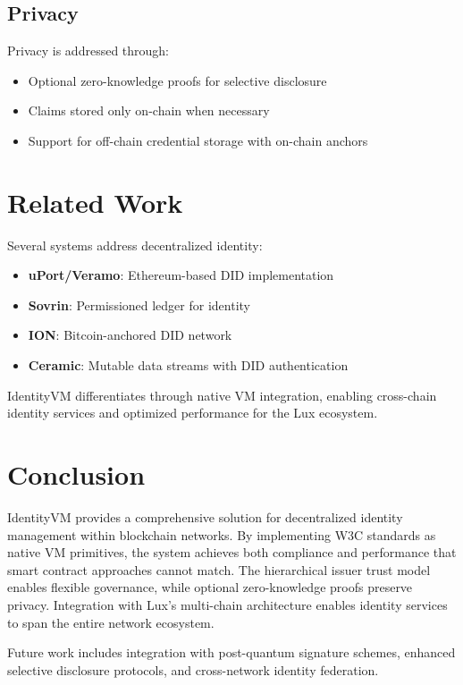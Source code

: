 \documentclass[11pt,twocolumn]{article}
\begin{document}
\subsection{Privacy}

Privacy is addressed through:

\begin{itemize}
\item Optional zero-knowledge proofs for selective disclosure
\item Claims stored only on-chain when necessary
\item Support for off-chain credential storage with on-chain anchors
\end{itemize}

\section{Related Work}

Several systems address decentralized identity:

\begin{itemize}
\item \textbf{uPort/Veramo}: Ethereum-based DID implementation
\item \textbf{Sovrin}: Permissioned ledger for identity
\item \textbf{ION}: Bitcoin-anchored DID network
\item \textbf{Ceramic}: Mutable data streams with DID authentication
\end{itemize}

IdentityVM differentiates through native VM integration, enabling cross-chain identity services and optimized performance for the Lux ecosystem.

\section{Conclusion}

IdentityVM provides a comprehensive solution for decentralized identity management within blockchain networks. By implementing W3C standards as native VM primitives, the system achieves both compliance and performance that smart contract approaches cannot match. The hierarchical issuer trust model enables flexible governance, while optional zero-knowledge proofs preserve privacy. Integration with Lux's multi-chain architecture enables identity services to span the entire network ecosystem.

Future work includes integration with post-quantum signature schemes, enhanced selective disclosure protocols, and cross-network identity federation.
\end{document}
